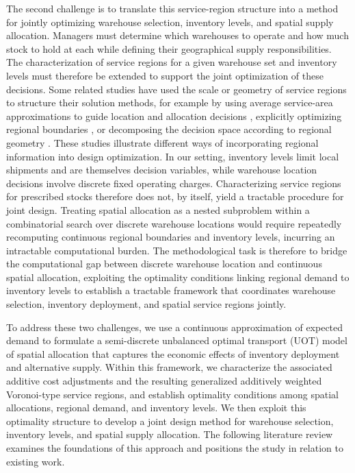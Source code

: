 \documentclass[a4paper,fleqn]{cas-sc}
\theoremstyle{remark}
\theoremstyle{plain}
\begin{document}
The second challenge is to translate this service-region structure into a method for jointly optimizing warehouse selection, inventory levels, and spatial supply allocation. Managers must determine which warehouses to operate and how much stock to hold at each while defining their geographical supply responsibilities. The characterization of service regions for a given warehouse set and inventory levels must therefore be extended to support the joint optimization of these decisions. Some related studies have used the scale or geometry of service regions to structure their solution methods, for example by using average service-area approximations to guide location and allocation decisions \citep{mizutani2025spare}, explicitly optimizing regional boundaries \citep{murat2010continuous}, or decomposing the decision space according to regional geometry \citep{averbakh2015structural}. These studies illustrate different ways of incorporating regional information into design optimization. In our setting, inventory levels limit local shipments and are themselves decision variables, while warehouse location decisions involve discrete fixed operating charges. Characterizing service regions for prescribed stocks therefore does not, by itself, yield a tractable procedure for joint design. Treating spatial allocation as a nested subproblem within a combinatorial search over discrete warehouse locations would require repeatedly recomputing continuous regional boundaries and inventory levels, incurring an intractable computational burden. The methodological task is therefore to bridge the computational gap between discrete warehouse location and continuous spatial allocation, exploiting the optimality conditions linking regional demand to inventory levels to establish a tractable framework that coordinates warehouse selection, inventory deployment, and spatial service regions jointly.

To address these two challenges, we use a continuous approximation of expected demand to formulate a semi-discrete unbalanced optimal transport (UOT) model of spatial allocation that captures the economic effects of inventory deployment and alternative supply. Within this framework, we characterize the associated additive cost adjustments and the resulting generalized additively weighted Voronoi-type service regions, and establish optimality conditions among spatial allocations, regional demand, and inventory levels. We then exploit this optimality structure to develop a joint design method for warehouse selection, inventory levels, and spatial supply allocation. The following literature review examines the foundations of this approach and positions the study in relation to existing work.
\end{document}
